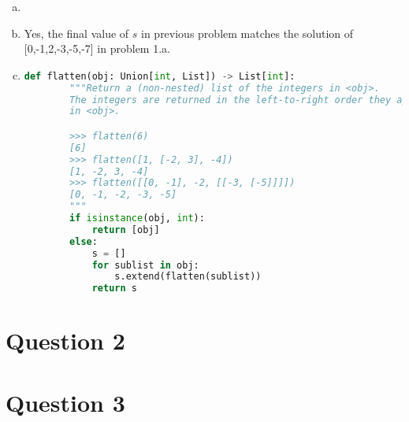 \documentclass[12pt]{article}
\begin{document}
\begin{enumerate}[a.]
    \item

    \item Yes, the final value of $s$ in previous problem matches the solution of
    [0,-1,2,-3,-5,-7] in problem 1.a.

    \item

    \begin{lstlisting}[language=Python]
    def flatten(obj: Union[int, List]) -> List[int]:
        """Return a (non-nested) list of the integers in <obj>.
        The integers are returned in the left-to-right order they appear
        in <obj>.

        >>> flatten(6)
        [6]
        >>> flatten([1, [-2, 3], -4])
        [1, -2, 3, -4]
        >>> flatten([[0, -1], -2, [[-3, [-5]]]])
        [0, -1, -2, -3, -5]
        """
        if isinstance(obj, int):
            return [obj]
        else:
            s = []
            for sublist in obj:
                s.extend(flatten(sublist))
            return s
    \end{lstlisting}

\end{enumerate}

\section*{Question 2}

\section*{Question 3}
\end{document}
